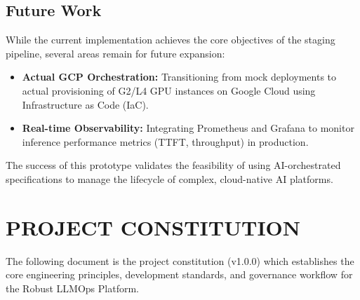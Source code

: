 \documentclass[a4paper,12pt]{report}
\begin{document}
\section{Future Work}
While the current implementation achieves the core objectives of the staging pipeline, several areas remain for future expansion:
\begin{itemize}
    \item \textbf{Actual GCP Orchestration:} Transitioning from mock deployments to actual provisioning of G2/L4 GPU instances on Google Cloud using Infrastructure as Code (IaC).
    \item \textbf{Real-time Observability:} Integrating Prometheus and Grafana to monitor inference performance metrics (TTFT, throughput) in production.
\end{itemize}

The success of this prototype validates the feasibility of using AI-orchestrated specifications to manage the lifecycle of complex, cloud-native AI platforms.




\appendix	
\chapter{PROJECT CONSTITUTION}
The following document is the project constitution (v1.0.0) which establishes the core engineering principles, development standards, and governance workflow for the Robust LLMOps Platform.
\end{document}
